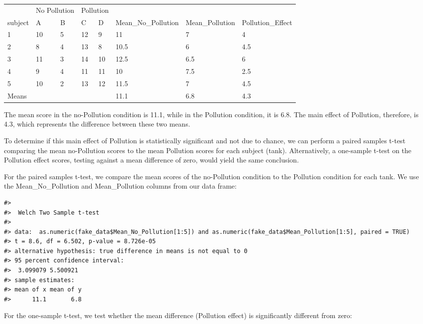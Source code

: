 \documentclass[
  letterpaper,
  DIV=11,
  numbers=noendperiod]{scrreprt}
\begin{document}
\begin{table}
\centering
\begin{tabular}{l|l|l|l|l|l|l|l}
\hline
\multicolumn{1}{c|}{ } & \multicolumn{2}{c|}{No Pollution} & \multicolumn{2}{c|}{Pollution} & \multicolumn{3}{c}{ } \\
\cline{2-3} \cline{4-5}
subject & A & B & C & D & Mean\_No\_Pollution & Mean\_Pollution & Pollution\_Effect\\
\hline
1 & 10 & 5 & 12 & 9 & 11 & 7 & 4\\
\hline
2 & 8 & 4 & 13 & 8 & 10.5 & 6 & 4.5\\
\hline
3 & 11 & 3 & 14 & 10 & 12.5 & 6.5 & 6\\
\hline
4 & 9 & 4 & 11 & 11 & 10 & 7.5 & 2.5\\
\hline
5 & 10 & 2 & 13 & 12 & 11.5 & 7 & 4.5\\
\hline
Means &  &  &  &  & 11.1 & 6.8 & 4.3\\
\hline
\end{tabular}
\end{table}

The mean score in the no-Pollution condition is 11.1, while in the
Pollution condition, it is 6.8. The main effect of Pollution, therefore,
is 4.3, which represents the difference between these two means.

To determine if this main effect of Pollution is statistically
significant and not due to chance, we can perform a paired samples
t-test comparing the mean no-Pollution scores to the mean Pollution
scores for each subject (tank). Alternatively, a one-sample t-test on
the Pollution effect scores, testing against a mean difference of zero,
would yield the same conclusion.

For the paired samples t-test, we compare the mean scores of the
no-Pollution condition to the Pollution condition for each tank. We use
the Mean\_No\_Pollution and Mean\_Pollution columns from our data frame:

\begin{verbatim}
#> 
#>  Welch Two Sample t-test
#> 
#> data:  as.numeric(fake_data$Mean_No_Pollution[1:5]) and as.numeric(fake_data$Mean_Pollution[1:5], paired = TRUE)
#> t = 8.6, df = 6.502, p-value = 8.726e-05
#> alternative hypothesis: true difference in means is not equal to 0
#> 95 percent confidence interval:
#>  3.099079 5.500921
#> sample estimates:
#> mean of x mean of y 
#>      11.1       6.8
\end{verbatim}

For the one-sample t-test, we test whether the mean difference
(Pollution effect) is significantly different from zero:
\end{document}
